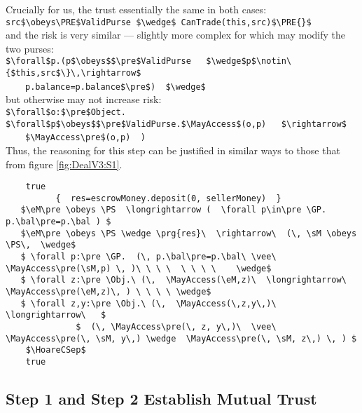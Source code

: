 Crucially for us, the trust essentially the same in both cases:\\
\mbox{\lstinline+src$\obeys\PRE$ValidPurse $\wedge$ CanTrade(this,src)$\PRE{}$+}\\
\noindent and the risk is very similar --- slightly more complex for
 which may modify the two purses:\\
\noindent \mbox{\lstinline+$\forall$p.(p$\obeys$$\pre$ValidPurse
  $\wedge$p$\notin\{$this,src$\}\,\rightarrow$+}\\
\mbox{~~~~\lstinline+p.balance=p.balance$\pre$)  $\wedge$+}\\
\noindent  but otherwise may not increase risk:\\
\noindent\mbox{\lstinline+$\forall$o:$\pre$Object. $\forall$p$\obeys$$\pre$ValidPurse.$\MayAccess$(o,p)
  $\rightarrow$+}\\
\noindent\mbox{~~~~\lstinline+$\MayAccess\pre$(o,p)  )+}\\
\noindent Thus, the reasoning for this step can be justified in
similar ways to those that from figure \ref{fig:DealV3:S1}. 



\begin{figure*}[htb]
\begin{lstlisting}
    true
          {  res=escrowMoney.deposit(0, sellerMoney)  }
   $\eM\pre \obeys \PS  \longrightarrow (  \forall p\in\pre \GP. p.\bal\pre=p.\bal ) $
   $\eM\pre \obeys \PS \wedge \prg{res}\  \rightarrow\  (\, \sM \obeys \PS\,  \wedge$
   $ \forall p:\pre \GP.  (\, p.\bal\pre=p.\bal\ \vee\ \MayAccess\pre(\sM,p) \, )\ \ \ \  \ \ \ \    \wedge$
   $ \forall z:\pre \Obj.\ (\,  \MayAccess(\eM,z)\  \longrightarrow\   \MayAccess\pre(\eM,z)\, ) \ \ \ \ \wedge$
   $ \forall z,y:\pre \Obj.\ (\,  \MayAccess(\,z,y\,)\  \longrightarrow\   $
              $  (\, \MayAccess\pre(\, z, y\,)\  \vee\  \MayAccess\pre(\, \sM, y\,) \wedge  \MayAccess\pre(\, \sM, z\,) \, ) $
    $\HoareCSep$
    true
 \end{lstlisting}
\caption{Hoare tuple for second step in }
\label{fig:DealV3:S2}
\end{figure*}

 


\newpage
\subsection{Step 1 and Step 2 Establish Mutual Trust}


